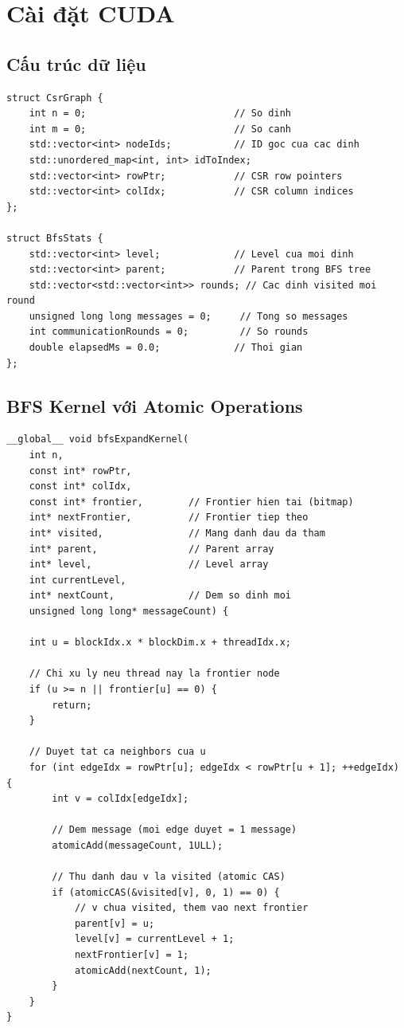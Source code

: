 \section{Cài đặt CUDA}

\subsection{Cấu trúc dữ liệu}

\begin{lstlisting}[caption={Cấu trúc CSR Graph và BFS Statistics}, label={lst:csr_struct}]
struct CsrGraph {
    int n = 0;                          // So dinh
    int m = 0;                          // So canh
    std::vector<int> nodeIds;           // ID goc cua cac dinh
    std::unordered_map<int, int> idToIndex;
    std::vector<int> rowPtr;            // CSR row pointers
    std::vector<int> colIdx;            // CSR column indices
};

struct BfsStats {
    std::vector<int> level;             // Level cua moi dinh
    std::vector<int> parent;            // Parent trong BFS tree
    std::vector<std::vector<int>> rounds; // Cac dinh visited moi round
    unsigned long long messages = 0;     // Tong so messages
    int communicationRounds = 0;         // So rounds
    double elapsedMs = 0.0;             // Thoi gian
};
\end{lstlisting}

\subsection{BFS Kernel với Atomic Operations}

\begin{lstlisting}[caption={BFS Expand Kernel}, label={lst:bfs_kernel}]
__global__ void bfsExpandKernel(
    int n,
    const int* rowPtr,
    const int* colIdx,
    const int* frontier,        // Frontier hien tai (bitmap)
    int* nextFrontier,          // Frontier tiep theo
    int* visited,               // Mang danh dau da tham
    int* parent,                // Parent array
    int* level,                 // Level array
    int currentLevel,
    int* nextCount,             // Dem so dinh moi
    unsigned long long* messageCount) {
    
    int u = blockIdx.x * blockDim.x + threadIdx.x;
    
    // Chi xu ly neu thread nay la frontier node
    if (u >= n || frontier[u] == 0) {
        return;
    }
    
    // Duyet tat ca neighbors cua u
    for (int edgeIdx = rowPtr[u]; edgeIdx < rowPtr[u + 1]; ++edgeIdx) {
        int v = colIdx[edgeIdx];
        
        // Dem message (moi edge duyet = 1 message)
        atomicAdd(messageCount, 1ULL);
        
        // Thu danh dau v la visited (atomic CAS)
        if (atomicCAS(&visited[v], 0, 1) == 0) {
            // v chua visited, them vao next frontier
            parent[v] = u;
            level[v] = currentLevel + 1;
            nextFrontier[v] = 1;
            atomicAdd(nextCount, 1);
        }
    }
}
\end{lstlisting}

